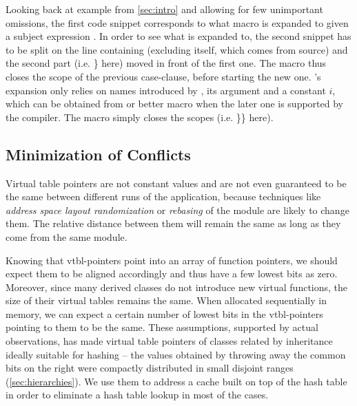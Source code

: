 Looking back at example from \textsection\ref{sec:intro} and allowing for few 
unimportant omissions, the first code snippet corresponds to what macro 
 is expanded to given a subject expression . In order to 
see what  is expanded to, the second snippet has to be split on 
the line containing  (excluding  itself, which comes from 
source) and the second part (i.e. \} here) moved in front of the first one. The 
macro thus closes the scope of the previous case-clause, before starting the new 
one. 's expansion only relies on names introduced by , 
its argument  and a constant $i$, which can be obtained from 
 or better  macro when the later one is 
supported by the compiler. The  macro simply closes the scopes 
(i.e. \}\} here).


\subsection{Minimization of Conflicts}
\label{sec:moc}

Virtual table pointers are not constant values and are not even guaranteed to be 
the same between different runs of the application, because techniques like 
\emph{address space layout randomization} or \emph{rebasing} of the module are 
likely to change them. The relative distance between them will remain the same 
as long as they come from the same module.

Knowing that vtbl-pointers point into an array of function pointers, we should 
expect them to be aligned accordingly and thus have a few lowest bits as zero. 
Moreover, since many derived classes do not introduce new virtual functions, 
the size of their virtual tables remains the same. When allocated sequentially 
in memory, we can expect a certain number of lowest bits in the vtbl-pointers 
pointing to them to be the same.
These assumptions, supported by actual observations, has made virtual table 
pointers of classes related by inheritance ideally suitable for hashing -- the 
values obtained by throwing away the common bits on the right were compactly 
distributed in small disjoint ranges (\textsection\ref{sec:hierarchies}). We use 
them to address a cache built on top of the hash table in order to eliminate a 
hash table lookup in most of the cases.

